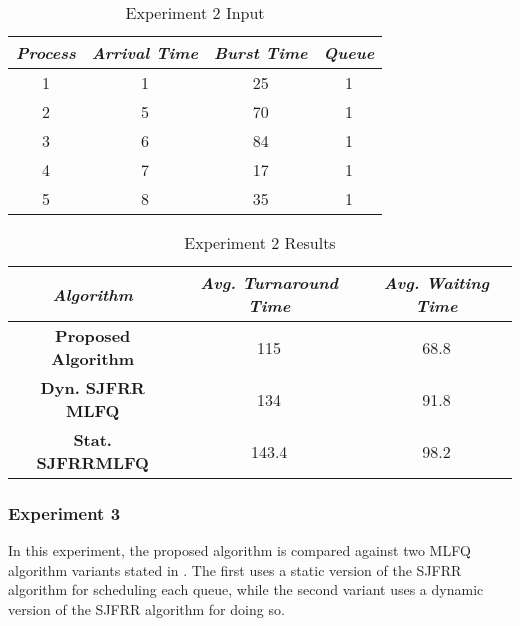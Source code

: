 \documentclass[conference]{IEEEtran}
\newcommand\T{\rule{0pt}{2.6ex}}       %
\newcommand\B{\rule[-1.2ex]{0pt}{0pt}} %
\begin{document}
\begin{table}[H]
    \caption{Experiment 2 Input}
    \centering
     \begin{tabular}{||c c c c||} 
     \hline
     \textit{\textbf{Process}} & \textit{\textbf{Arrival Time}} & \textit{\textbf{Burst Time}} & \textit{\textbf{Queue}} \T \B \\ 
     \hline
     \hline
     1 & 1 & 25 & 1 \T \B \\ 
     \hline
     2 & 5 & 70 & 1 \T \B \\
     \hline
     3 & 6 & 84 & 1 \T \B \\
     \hline
     4 & 7 & 17 & 1 \T \B \\
     \hline
     5 & 8 & 35 & 1 \T \B \\ 
     \hline
     \end{tabular}
\end{table}

\begin{table}[H]
    \caption{Experiment 2 Results}
    \centering
    \begin{tabular}{||c c c||}
        \hline
        \textit{\textbf{Algorithm}} & \textit{\textbf{Avg. Turnaround Time}} & \textit{\textbf{Avg. Waiting Time}}\T \B \\
    \hline
    \hline
    \textbf{Proposed Algorithm} & 115 & 68.8 \T \B\\ \hline
    \textbf{Dyn. SJFRR MLFQ} & 134 & 91.8\T \B\\ \hline
    \textbf{Stat. SJFRRMLFQ} & 143.4 & 98.2 \T \B\\ \hline
     \end{tabular}
\end{table}

\subsubsection{Experiment 3}

In this experiment, the proposed algorithm is compared against two MLFQ algorithm variants stated in \cite{b5}. The first uses a static version of the SJFRR algorithm for scheduling each queue, while the second variant uses a dynamic version of the SJFRR algorithm for doing so.
\end{document}

